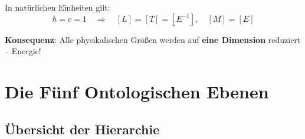 In natürlichen Einheiten gilt:
\begin{equation}
\hbar = c = 1 \quad \Rightarrow \quad [L] = [T] = [E^{-1}], \quad [M] = [E]
\end{equation}

\textbf{Konsequenz}: Alle physikalischen Größen werden auf \textbf{eine Dimension} reduziert -- Energie!

\begin{table}[h]
\centering
{}
\caption{Dimensionale Reduktion in natürlichen Einheiten}
\end{table}

\section{Die Fünf Ontologischen Ebenen}

\subsection{Übersicht der Hierarchie}

